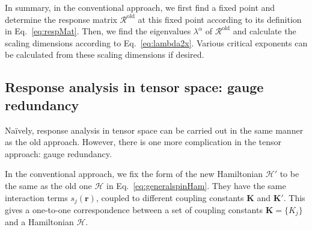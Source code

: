 \documentclass[aps,prb,reprint,superscriptaddress]{revtex4-2}
\begin{document}
In summary, in the conventional approach, we first find a fixed point
and determine the response matrix $\mathcal{R}^{\text{old}}$ at this
fixed point according to its definition in Eq.~\eqref{eq:respMat}. Then,
we find the eigenvalues $\lambda^{\alpha}$ of $\mathcal{R}^{\text{old}}$
and calculate the scaling dimensions according to
Eq.~\eqref{eq:lambda2x}.  Various critical exponents can be calculated
from these scaling dimensions if desired. 

\subsection{Response analysis in tensor space: gauge redundancy}
Na\"ively, response analysis in tensor space can be carried out
in the same manner as the old approach. However, there is one more
complication in the tensor approach: gauge redundancy.
%

In the conventional approach, we fix the form of the new Hamiltonian
$\mathcal{H}'$ to be the same as the old one $\mathcal{H}$ in
Eq.~\eqref{eq:generalspinHam}. They have the same interaction terms
$s_j(\mathbf{r})$, coupled to different coupling constants
$\mathbf{K}$ and $\mathbf{K}'$. This gives a one-to-one correspondence
between a set of coupling constants $\mathbf{K} = \{K_j \}$ and a
Hamiltonian $\mathcal{H}$.
\end{document}
